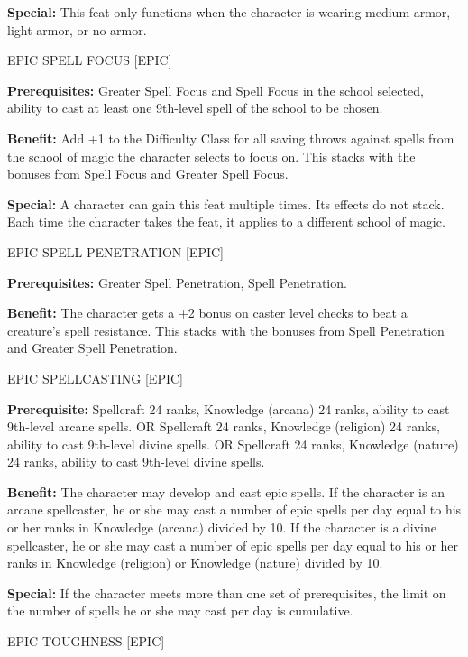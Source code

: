 \documentclass{article}
\begin{document}
\textbf{Special:} This feat only functions when the character is wearing medium 
armor, light armor, or no armor. 

\vspace{12pt}
EPIC SPELL FOCUS [EPIC] 

\textbf{Prerequisites:} Greater Spell Focus and Spell Focus in the school selected, 
ability to cast at least one 9th-level spell of the school to be chosen. 

\textbf{Benefit:} Add +1 to the Difficulty Class for all saving throws against 
spells from the school of magic the character selects to focus on. This stacks 
with the bonuses from Spell Focus and Greater Spell Focus. 

\textbf{Special:} A character can gain this feat multiple times. Its effects do 
not stack. Each time the character takes the feat, it applies to a different school 
of magic. 

\vspace{12pt}
EPIC SPELL PENETRATION [EPIC] 

\textbf{Prerequisites:} Greater Spell Penetration, Spell Penetration. 

\textbf{Benefit:} The character gets a +2 bonus on caster level checks to beat 
a creature's spell resistance. This stacks with the bonuses from Spell Penetration 
and Greater Spell Penetration. 

\vspace{12pt}
EPIC SPELLCASTING [EPIC] 

\textbf{Prerequisite:} Spellcraft 24 ranks, Knowledge (arcana) 24 ranks, ability 
to cast 9th-level arcane spells. OR Spellcraft 24 ranks, Knowledge (religion) 24 
ranks, ability to cast 9th-level divine spells. OR Spellcraft 24 ranks, Knowledge 
(nature) 24 ranks, ability to cast 9th-level divine spells. 

\textbf{Benefit:} The character may develop and cast epic spells.  If the character 
is an arcane spellcaster, he or she may cast a number of epic spells per day equal 
to his or her ranks in Knowledge (arcana) divided by 10. If the character is a 
divine spellcaster, he or she may cast a number of epic spells per day equal to 
his or her ranks in Knowledge (religion) or Knowledge (nature) divided by 10. 

\textbf{Special:} If the character meets more than one set of prerequisites, the 
limit on the number of spells he or she may cast per day is cumulative. 

\vspace{12pt}
EPIC TOUGHNESS [EPIC] 
\end{document}
